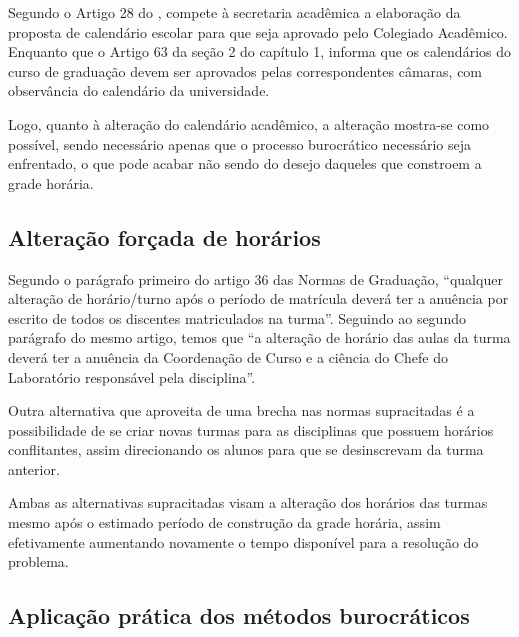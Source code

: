 
Segundo o Artigo 28 do \cite[Estatuto da UENF]{Estatuto2002}, compete à secretaria acadêmica a elaboração da proposta de calendário escolar para que seja aprovado pelo Colegiado Acadêmico. Enquanto que o Artigo 63 da seção 2 do capítulo 1, informa que os calendários do curso de graduação devem ser aprovados pelas correspondentes câmaras, com observância do calendário da universidade.

Logo, quanto à alteração do calendário acadêmico, a alteração mostra-se como possível, sendo necessário apenas que o processo burocrático necessário seja enfrentado, o que pode acabar não sendo do desejo daqueles que constroem a grade horária.

\subsection{Alteração forçada de horários} \label{ssec:burocracia-troca} %

Segundo o parágrafo primeiro do artigo 36 das Normas de Graduação, ``qualquer alteração de horário/turno após o período de matrícula deverá ter a anuência por escrito de todos os discentes matriculados na turma''. Seguindo ao segundo parágrafo do mesmo artigo, temos que ``a alteração de horário das aulas da turma deverá ter a anuência da Coordenação de Curso e a ciência do Chefe do Laboratório responsável pela disciplina''.

Outra alternativa que aproveita de uma brecha nas normas supracitadas é a possibilidade de se criar novas turmas para as disciplinas que possuem horários conflitantes, assim direcionando os alunos para que se desinscrevam da turma anterior.

Ambas as alternativas supracitadas visam a alteração dos horários das turmas mesmo após o estimado período de construção da grade horária, assim efetivamente aumentando novamente o tempo disponível para a resolução do problema.


\subsection{Aplicação prática dos métodos burocráticos} %

